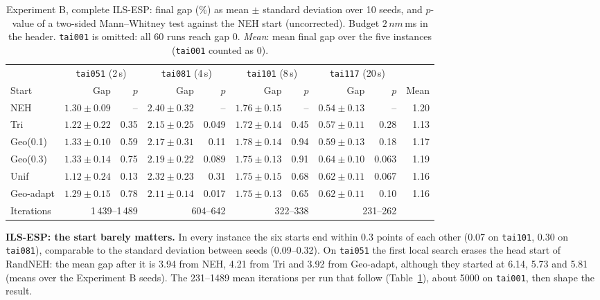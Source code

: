 \documentclass[10pt,a4paper]{article}
\begin{document}
\begin{table}[!t]
\centering
\caption{Experiment B, complete ILS-ESP: final gap (\%) as mean $\pm$ standard deviation over 10 seeds,
and $p$-value of a two-sided Mann--Whitney test against the NEH start (uncorrected). Budget $2\,nm$\,ms
in the header. \texttt{tai001} is omitted: all 60 runs reach gap 0. \emph{Mean}: mean final gap over
the five instances (\texttt{tai001} counted as 0).}
\label{tab:ils}
\scriptsize
\setlength{\tabcolsep}{4pt}
\begin{tabular}{@{}lrrrrrrrrr@{}}
\toprule
 & \multicolumn{2}{c}{\texttt{tai051} (2\,s)} & \multicolumn{2}{c}{\texttt{tai081} (4\,s)}
 & \multicolumn{2}{c}{\texttt{tai101} (8\,s)} & \multicolumn{2}{c}{\texttt{tai117} (20\,s)} & \\
Start & Gap & $p$ & Gap & $p$ & Gap & $p$ & Gap & $p$ & Mean \\
\midrule
NEH       & $1.30\pm0.09$ & --   & $2.40\pm0.32$ & --    & $1.76\pm0.15$ & --   & $0.54\pm0.13$ & --    & 1.20 \\
Tri       & $1.22\pm0.22$ & 0.35 & $2.15\pm0.25$ & 0.049 & $1.72\pm0.14$ & 0.45 & $0.57\pm0.11$ & 0.28  & 1.13 \\
Geo(0.1)  & $1.33\pm0.10$ & 0.59 & $2.17\pm0.31$ & 0.11  & $1.78\pm0.14$ & 0.94 & $0.59\pm0.13$ & 0.18  & 1.17 \\
Geo(0.3)  & $1.33\pm0.14$ & 0.75 & $2.19\pm0.22$ & 0.089 & $1.75\pm0.13$ & 0.91 & $0.64\pm0.10$ & 0.063 & 1.19 \\
Unif      & $1.12\pm0.24$ & 0.13 & $2.32\pm0.23$ & 0.31  & $1.75\pm0.15$ & 0.68 & $0.62\pm0.11$ & 0.067 & 1.16 \\
Geo-adapt & $1.29\pm0.15$ & 0.78 & $2.11\pm0.14$ & 0.017 & $1.75\pm0.13$ & 0.65 & $0.62\pm0.11$ & 0.10  & 1.16 \\
\midrule
Iterations & \multicolumn{2}{r}{1\,439--1\,489} & \multicolumn{2}{r}{604--642} & \multicolumn{2}{r}{322--338}
 & \multicolumn{2}{r}{231--262} & \\
\bottomrule
\end{tabular}
\end{table}

\textbf{ILS-ESP: the start barely matters.} In every instance the six starts end within 0.3 points of
each other (0.07 on \texttt{tai101}, 0.30 on \texttt{tai081}), comparable to the standard deviation
between seeds (0.09--0.32). On
\texttt{tai051} the first local search erases the head start of RandNEH: the mean gap after it is 3.94
from NEH, 4.21 from Tri and 3.92 from Geo-adapt, although they started at 6.14, 5.73 and 5.81
(means over the Experiment B seeds). The 231--1489 mean iterations per run that follow (Table~\ref{tab:ils}), about
5000 on \texttt{tai001}, then shape the result.
\end{document}

